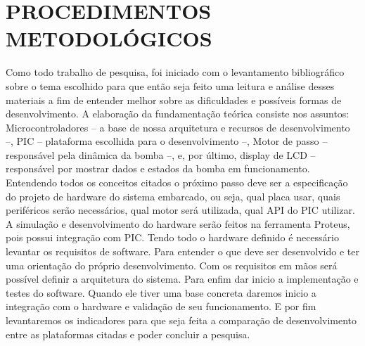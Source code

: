 \section{PROCEDIMENTOS METODOLÓGICOS}
\newline
Como todo trabalho de pesquisa, foi iniciado com o levantamento bibliográfico sobre o tema escolhido para que então seja feito uma leitura e análise desses materiais a fim de entender melhor sobre as dificuldades e possíveis formas de desenvolvimento. A elaboração da fundamentação teórica consiste nos assuntos: Microcontroladores – a base de nossa arquitetura e recursos de desenvolvimento –, PIC – plataforma escolhida para o desenvolvimento –, Motor de passo – responsável pela dinâmica da bomba –, e, por último, display de LCD – responsável por mostrar dados e estados da bomba em funcionamento.
Entendendo todos os conceitos citados o próximo passo deve ser a especificação do projeto de hardware do sistema embarcado, ou seja, qual placa usar, quais periféricos serão necessários, qual motor será utilizada, qual API do PIC utilizar. A simulação e desenvolvimento do hardware serão feitos na ferramenta Proteus, pois possui integração com PIC.
Tendo todo o hardware definido é necessário levantar os requisitos de software. Para entender o que deve ser desenvolvido e ter uma orientação do próprio desenvolvimento. Com os requisitos em mãos será possível definir a arquitetura do sistema. Para enfim dar inicio a implementação e testes do software. Quando ele tiver uma base concreta daremos inicio a integração com o hardware e validação de seu funcionamento. E por fim levantaremos os indicadores para que seja feita a comparação de desenvolvimento entre as plataformas citadas e poder concluir a pesquisa.
